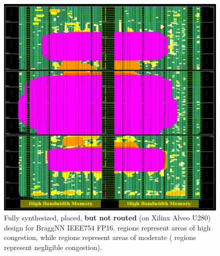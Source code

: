 \begin{figure}
	\includegraphics[width=\columnwidth]{figures/congestion_alveo}
	\caption{Fully synthesized, placed, \textbf{but not routed} (on Xilinx Alveo U280) design for BraggNN IEEE754 FP16. \crule[violet]{0.25cm}{0.25cm} regions represent areas of high congestion, while \crule[orange]{0.25cm}{0.25cm} regions represent areas of moderate (\crule[green]{0.25cm}{0.25cm} regions represent negligible congestion).}\label{fig:congestion_alveo}
\end{figure}
